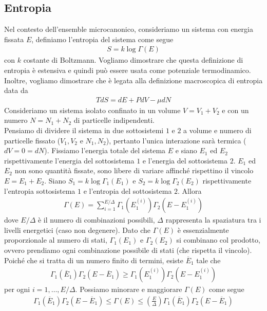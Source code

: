 \documentclass{article}
\begin{document}
\newpage
\subsection{Entropia}
Nel contesto dell'ensemble microcanonico, consideriamo un sistema con energia fissata $E$, definiamo l'entropia del sistema come segue
\begin{gather}
    S = k\log \Gamma(E) \tag{1.2.1}
\end{gather}
con $k$ costante di Boltzmann. Vogliamo dimostrare che questa definizione di entropia è estensiva e quindi può essere usata come potenziale termodinamico. Inoltre, vogliamo dimostrare che è legata alla definizione macroscopica di entropia data da
\begin{gather}
    TdS = dE + PdV - \mu dN \tag{1.2.2}
\end{gather}
Consideriamo un sistema isolato confinato in un volume $V = V_1 + V_2$ e con un numero $N = N_1 + N_2$ di particelle indipendenti. \\
Pensiamo di dividere il sistema in due sottosistemi $1$ e $2$ a volume e numero di particelle fissato ($V_1, V_2$ e $N_1, N_2$), pertanto l'unica interazione sarà termica ($dV = 0 = dN$). Fissiamo l'energia totale del sistema $E$ e siano $E_1$ ed $E_2$ rispettivamente l'energia del sottosistema $1$ e l'energia del sottosistema $2$. $E_1$ ed $E_2$ non sono quantità fissate, sono libere di variare affinché rispettino il vincolo $E = E_1 + E_2$. Siano $S_1 = k\log \Gamma_1(E_1)$ e $S_2 = k\log \Gamma_2(E_2)$ rispettivamente l'entropia sottosistema $1$ e l'entropia del sottosistema $2$. Allora
\begin{gather}
    \Gamma(E) = \sum_{i = 1}^{E/\Delta} \Gamma_1(E^{(i)}_1)\Gamma_2(E - E^{(i)}_1) \tag{1.2.3}
\end{gather}
dove $E/\Delta$ è il numero di combinazioni possibili, $\Delta$ rappresenta la spaziatura tra i livelli energetici (caso non degenere). Dato che $\Gamma(E)$ è essenzialmente proporzionale al numero di stati, $\Gamma_1(E_1)$ e $\Gamma_2(E_2)$ si combinano col prodotto, ovvero prendiamo ogni combinazione possibile di stati (che rispetta il vincolo). Poiché che si tratta di un numero finito di termini, esiste $\overline{E}_1$ tale che
\begin{gather}
    \Gamma_1(\overline{E}_1)\Gamma_2(E - \overline{E}_1) \geq \Gamma_1(E^{(i)}_1)\Gamma_2(E - E^{(i)}_1) \tag{1.2.4}
\end{gather}
per ogni $i = 1, \dots, E/\Delta$. Possiamo minorare e maggiorare $\Gamma(E)$ come segue
\begin{gather}
    \Gamma_1(\overline{E}_1)\Gamma_2(E - \overline{E}_1) \leq \Gamma(E) \leq \left(\frac{E}{\Delta}\right) \Gamma_1(\overline{E}_1)\Gamma_2(E - \overline{E}_1) \tag{1.2.5}
\end{gather}
\end{document}
